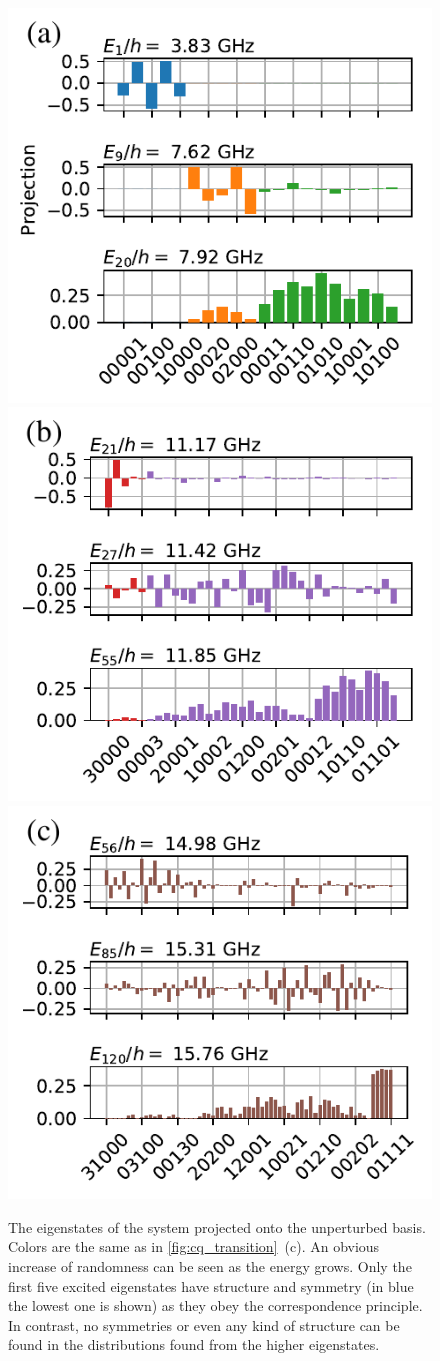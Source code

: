 \documentclass[%
 aps, pra,
 amsmath,amssymb,
 reprint,%
superscriptaddress
]{revtex4-2}
\begin{document}
\begin{figure}[t]
	\centering
	\includegraphics[width=.33\linewidth]{Pictures/eigenstates1}
	\includegraphics[width=.33\linewidth]{Pictures/eigenstates2}
	\includegraphics[width=.33\linewidth]{Pictures/eigenstates3}
	\caption{The eigenstates of the system projected onto the unperturbed basis. Colors are the same as in \autoref{fig:cq_transition}~(c). An obvious increase of randomness can be seen as the energy grows. Only the first five excited eigenstates have structure and symmetry (in blue the lowest one is shown) as they obey the correspondence principle. In contrast, no symmetries or even any kind of structure can be found in the distributions found from the higher eigenstates.}
	\label{fig:eigenstates}
\end{figure}
\end{document}
